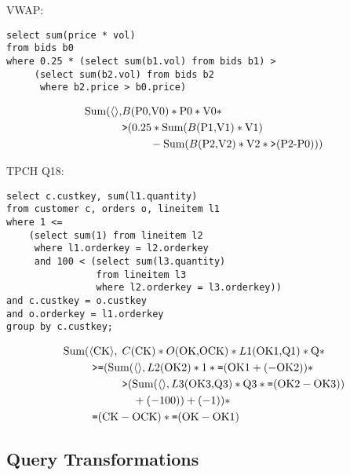 
\noindent VWAP:
\begin{verbatim}
select sum(price * vol)
from bids b0
where 0.25 * (select sum(b1.vol) from bids b1) >
     (select sum(b2.vol) from bids b2
      where b2.price > b0.price)
\end{verbatim}

\begin{align*}
\mbox{Sum}({\langle\rangle},
& B(\mbox{P0,V0}) * \mbox{P0} * \mbox{V0} *\\
& \mbox{{\tt >}}(0.25 * \mbox{Sum}(B(\mbox{P1,V1}) * \mbox{V1}) \\
& \qquad \; \; - \mbox{Sum}(B(\mbox{P2,V2}) * \mbox{V2} * \mbox{{\tt >}}(\mbox{P2-P0})))
\end{align*}


\noindent TPCH Q18:
\begin{verbatim}
select c.custkey, sum(l1.quantity)
from customer c, orders o, lineitem l1
where 1 <=
    (select sum(1) from lineitem l2
     where l1.orderkey = l2.orderkey
     and 100 < (select sum(l3.quantity)
                from lineitem l3
                where l2.orderkey = l3.orderkey))
and c.custkey = o.custkey
and o.orderkey = l1.orderkey
group by c.custkey;
\end{verbatim}

\begin{align*}
\mbox{Sum}(& {\langle\mbox{CK}\rangle},
  \; C(\mbox{CK}) * O(\mbox{OK,OCK}) * L1(\mbox{OK1,Q1}) * \mbox{Q} * \\
& \; \mbox{{\tt >=}}(\mbox{Sum}({\langle\rangle}, L2(\mbox{OK2}) * 1 *
     \mbox{{\tt =}}(\mbox{OK1}+(-\mbox{OK2})) * \\
& \qquad \quad
    \mbox{{\tt >}}(\mbox{Sum}({\langle\rangle}, L3(\mbox{OK3,Q3}) * \mbox{Q3} *
    \mbox{{\tt =}}(\mbox{OK2} - \mbox{OK3}))
\\ & \qquad \qquad + (-100)) + (-1)) * \\
& \; \mbox{{\tt =}}(\mbox{CK} - \mbox{OCK}) * \mbox{{\tt =}}(\mbox{OK} - \mbox{OK1})
\end{align*}

\subsection{Query Transformations}

